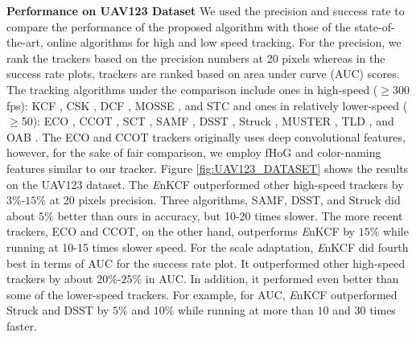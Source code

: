 \documentclass[10pt,twocolumn,letterpaper]{article}
\begin{document}
\textbf{Performance on UAV123 Dataset} We used the precision and
success rate to compare the performance of the proposed algorithm with
those of the state-of-the-art, online algorithms for high and low
speed tracking. For the precision, we rank the trackers based on the
precision numbers at 20 pixels whereas in the success rate plots,
trackers are ranked based on area under curve (AUC) scores. The
tracking algorithms under the comparison include ones in high-speed
($\geq$300 fps): KCF \cite{henriques2015high}, CSK
\cite{henriques2012exploiting}, DCF \cite{henriques2015high}, MOSSE
\cite{bolme2010visual}, and STC \cite{zhang2014fast} and ones in
relatively lower-speed ($\geq$50): ECO \cite{DanelljanCVPR2017}, CCOT
\cite{DanelljanECCV2016}, SCT \cite{Choi_2016_CVPR}, SAMF
\cite{li2014scale}, DSST \cite{danelljan2014accurate}, Struck
\cite{hare2012efficient}, MUSTER \cite{hong2015multi}, TLD
\cite{kalal2012tracking}, and OAB \cite{zhang2012robust}. The ECO and
CCOT trackers originally uses deep convolutional features, however,
for the sake of fair comparison, we employ fHoG and color-naming
features similar to our tracker. Figure \ref{fig:UAV123_DATASET} shows
the results on the UAV123 dataset. The {\it E}nKCF outperformed other
high-speed trackers by $3\%$-$15\%$ at 20 pixels precision. Three
algorithms, SAMF, DSST, and Struck did about $5\%$ better than ours in
accuracy, but 10-20 times slower. The more recent trackers, ECO and
CCOT, on the other hand, outperforms {\it E}nKCF by $15\%$ while
running at 10-15 times slower speed.  For the scale adaptation, {\it
  E}nKCF did fourth best in terms of AUC for the success rate plot. It
outperformed other high-speed trackers by about $20\%$-$25\%$ in
AUC. In addition, it performed even better than some of the
lower-speed trackers.  For example, for AUC, {\it E}nKCF outperformed
Struck and DSST by $5\%$ and $10\%$ while running at more than $10$
and $30$ times faster.
\end{document}
